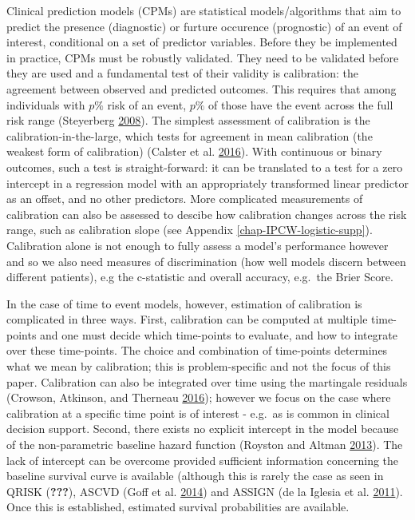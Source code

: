 \documentclass[
]{article}
\begin{document}
Clinical prediction models (CPMs) are statistical models/algorithms that aim to predict the presence (diagnostic) or furture occurence (prognostic) of an event of interest, conditional on a set of predictor variables. Before they be implemented in practice, CPMs must be robustly validated. They need to be validated before they are used and a fundamental test of their validity is calibration: the agreement between observed and predicted outcomes. This requires that among individuals with \(p\%\) risk of an event, \(p\%\) of those have the event across the full risk range (Steyerberg \protect\hyperlink{ref-steyerberg_clinical_2008}{2008}). The simplest assessment of calibration is the calibration-in-the-large, which tests for agreement in mean calibration (the weakest form of calibration) (Calster et al. \protect\hyperlink{ref-calster_calibration_2016-1}{2016}). With continuous or binary outcomes, such a test is straight-forward: it can be translated to a test for a zero intercept in a regression model with an appropriately transformed linear predictor as an offset, and no other predictors. More complicated measurements of calibration can also be assessed to descibe how calibration changes across the risk range, such as calibration slope (see Appendix \ref{chap-IPCW-logistic-supp}). Calibration alone is not enough to fully assess a model's performance however and so we also need measures of discrimination (how well models discern between different patients), e.g the c-statistic and overall accuracy, e.g.~the Brier Score.

In the case of time to event models, however, estimation of calibration is complicated in three ways. First, calibration can be computed at multiple time-points and one must decide which time-points to evaluate, and how to integrate over these time-points. The choice and combination of time-points determines what we mean by calibration; this is problem-specific and not the focus of this paper. Calibration can also be integrated over time using the martingale residuals (Crowson, Atkinson, and Therneau \protect\hyperlink{ref-crowson_assessing_2016}{2016}); however we focus on the case where calibration at a specific time point is of interest - e.g.~as is common in clinical decision support. Second, there exists no explicit intercept in the model because of the non-parametric baseline hazard function (Royston and Altman \protect\hyperlink{ref-royston_external_2013}{2013}). The lack of intercept can be overcome provided sufficient information concerning the baseline survival curve is available (although this is rarely the case as seen in QRISK ({\textbf{???}}), ASCVD (Goff et al. \protect\hyperlink{ref-goff_2013_2014}{2014}) and ASSIGN (de la Iglesia et al. \protect\hyperlink{ref-de_la_iglesia_performance_2011}{2011}). Once this is established, estimated survival probabilities are available.
\end{document}
